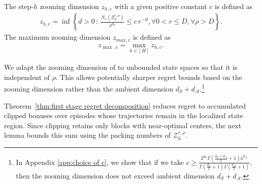 \documentclass[final,supplement]{siamart251216}
\begin{document}
\begin{definition}\label{def:zooming dimension}
The  step-$h$ zooming dimension $z_{h,c}$ with a given positive constant $c$ is defined as
\begin{eqnarray*}
    z_{h,c}=\inf\left\{d>0 \,:\, \frac{N_{r}(Z_{h}^{r,\rho})}{\rho^{d_{\mathcal{S}}}}\leq c\,r^{-d}, \forall 0<r\leq D , \forall \rho> D \right\}. 
\end{eqnarray*}
The maximum zooming dimension $z_{max,c}$ is defined as 
\begin{eqnarray*}
    z_{\max,c}=\max_{h \in [H]}z_{h,c}.
\end{eqnarray*}
\end{definition}

We adapt the zooming dimension of \cite{sinclair2023adaptive} to unbounded
state spaces so that it is independent of $\rho$. This allows potentially
sharper regret bounds based on the zooming dimension rather than the ambient
dimension $d_{\mathcal S}+d_{\mathcal A}$.\footnote{In Appendix \ref{app:choice of c}, we show that if we take $c\geq \frac{2^{d_{\mathcal{S}}}\Gamma(\frac{d_{\mathcal{S}}+d_{\mathcal{A}}}{2}+1)\bar{a}^{d_{\mathcal{A}}}}{\Gamma(
\frac{d_{\mathcal{S}}}{2}+1)\Gamma(
\frac{d_{\mathcal{A}}}{2}+1)}$, then the zooming dimension does not exceed ambient dimension $d_{\mathcal{S}}+d_{\mathcal{A}}$.}

Theorem~\ref{thm:first stage regret decomposition} reduces regret to
accumulated clipped bonuses over episodes whose trajectories remain in the
localized state region. Since clipping retains only blocks with near-optimal
centers, the next lemma bounds this sum using the packing numbers of
$\mathcal Z_h^{r,\rho}$.
\end{document}
